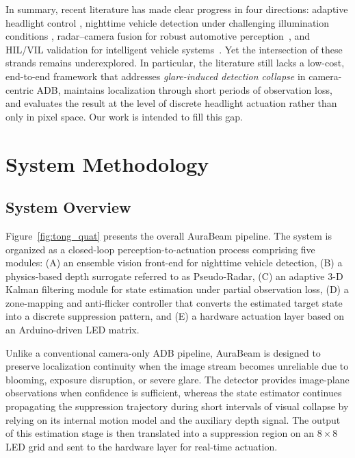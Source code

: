 \documentclass[pdflatex,sn-mathphys-num]{sn-jnl}%
\theoremstyle{thmstyleone}%
\theoremstyle{thmstyletwo}%
\theoremstyle{thmstylethree}%
\begin{document}

In summary, recent literature has made clear progress in four directions: adaptive headlight control \cite{nkrumah2024review,shin2026optimization}, nighttime vehicle detection under challenging illumination conditions \cite{zhang2024vision,lashkov2025machine,song2025highlightnet}, radar--camera fusion for robust automotive
perception~\cite{yao2023radar,deng2025advances,xiao2025radar}, and HIL/VIL validation for intelligent vehicle
systems~\cite{cheng2024survey,langer2026vehicle,balan2025perspective}. Yet the intersection of these strands remains underexplored. In particular, the literature still lacks a low-cost, end-to-end framework that
addresses \emph{glare-induced detection collapse} in camera-centric ADB, maintains localization through short periods of observation loss, and evaluates the result at the level of discrete headlight actuation rather than only in pixel space. Our work is intended to fill this gap.

\section{System Methodology}
\label{sec:method}

\subsection{System Overview}
\label{subsec:overview}

Figure~\ref{fig:tong_quat} presents the overall AuraBeam pipeline. The system is organized as a closed-loop perception-to-actuation process comprising five modules: (A) an ensemble vision front-end for nighttime vehicle detection, (B) a physics-based depth surrogate referred to as Pseudo-Radar, (C) an adaptive 3-D Kalman filtering module for state estimation under partial observation loss, (D) a zone-mapping and anti-flicker controller that converts the estimated target state into a discrete suppression pattern, and (E) a hardware actuation layer based on an Arduino-driven LED matrix.

Unlike a conventional camera-only ADB pipeline, AuraBeam is designed to preserve localization continuity when the image stream becomes unreliable due to blooming, exposure disruption, or severe glare. The detector provides image-plane observations when confidence is sufficient, whereas the state estimator continues propagating the suppression trajectory during short intervals of visual collapse by relying on its internal motion model and the auxiliary depth signal. The output of this estimation stage is then translated into a suppression region on an $8\times8$ LED grid and sent to the hardware layer for real-time actuation.
\end{document}

